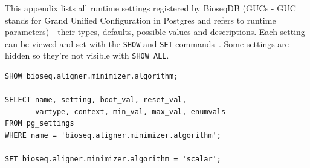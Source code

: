 \label{sec:appendix-configuration}
\label{sec:configuration-reference}
\label{app:configuration-reference}

This appendix lists all runtime settings registered by BioseqDB (GUCs - GUC stands for Grand Unified Configuration in Postgres and refers to runtime parameters) - their types, defaults, possible values and descriptions.
Each setting can be viewed and set with the \texttt{SHOW} and \texttt{SET} commands~\autocite{postgresql17_pg_settings,postgresql17_guc_functions}.
Some settings are hidden so they're not visible with \texttt{SHOW ALL}.

\begin{lstlisting}[style=bioseq-search-sql,
  caption={Inspecting and settingBioseqDB config values},
  label={lst:configuration-inspect}]
SHOW bioseq.aligner.minimizer.algorithm;

SELECT name, setting, boot_val, reset_val,
       vartype, context, min_val, max_val, enumvals
FROM pg_settings
WHERE name = 'bioseq.aligner.minimizer.algorithm';

SET bioseq.aligner.minimizer.algorithm = 'scalar';
\end{lstlisting}

